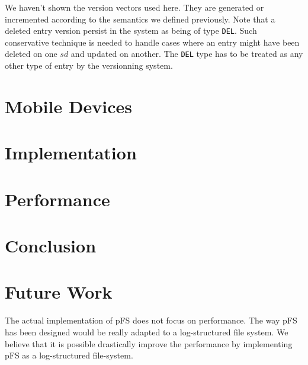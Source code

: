 \documentclass[letterpaper,twocolumn,10pt]{article}
\begin{document}
We haven't shown the version vectors used here. They are generated or
incremented according to the semantics we defined previously. Note
that a deleted entry version persist in the system as being of type
{\tt DEL}. Such conservative technique is needed to handle cases where
an entry might have been deleted on one $sd$ and updated on
another. The {\tt DEL} type has to be treated as any other type of
entry by the versionning system.


\section{Mobile Devices}

\section{Implementation}

\section{Performance}

\section{Conclusion}

\section{Future Work}

The actual implementation of pFS does not focus on performance. The
way pFS has been designed would be really adapted to a log-structured
file system. We believe that it is possible drastically improve the
performance by implementing pFS as a log-structured file-system.
\end{document}
